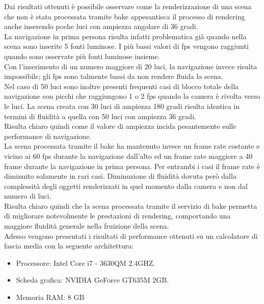 Dai risultati ottenuti è possibile osservare come la renderizzazione di una scena che non è stata processata tramite bake appesantisca il processo di rendering anche inserendo poche luci con ampiezza angolare di 36 gradi.
\\
La navigazione in prima persona risulta infatti problematica già quando nella scena sono inserite 5 fonti luminose. I più bassi valori di fps vengono raggiunti quando sono osservate più fonti luminose insieme.
\\
Con l’inserimento di un numero maggiore di 20 luci, la navigazione invece risulta impossibile; gli fps sono talmente bassi da non rendere fluida la scena.
\\
Nel caso di 50 luci sono inoltre presenti frequenti casi di blocco totale della navigazione con picchi che raggiungono 1 o 2 fps quando la camera è rivolta verso le luci.
La scena creata con 30 luci di ampiezza 180 gradi risulta identica in termini di fluidità a quella con 50 luci con ampiezza 36 gradi. 
\\
Risulta chiaro quindi come il valore di ampiezza incida pesantemente sulle performance di navigazione.
\\
La scena processata tramite il bake ha mantenuto invece un frame rate costante e vicino ai 60 fps durante la navigazione dall’alto ed un frame rate maggiore a 40 frame durante la navigazione in prima persona. Per entrambi i casi il frame rate è diminuito solamente in rari casi. Diminuzione di fluidità dovuta però dalla complessità degli oggetti renderizzati in quel momento dalla camera e non dal numero di luci.
\\
Risulta chiaro quindi che la scena processata tramite il servizio di bake permetta di migliorare notevolmente le prestazioni di rendering, comportando una maggiore fluidità generale nella fruizione della scena. 
\\
Adesso vengono presentati i risultati di performance ottenuti su un calcolatore di fascia media con la seguente architettura:
\begin{itemize}
\item Processore: Intel Core i7 - 3630QM 2.4GHZ.
\item Scheda grafica: NVIDIA GeForce GT635M 2GB.
\item Memoria RAM: 8 GB
\end{itemize}

